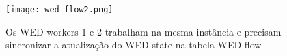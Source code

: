 \documentclass[conference]{IEEEtran}
\begin{document}
\begin{figure}[!t]
\centering
\texttt{[image: wed-flow2.png]}
\caption{Os WED-workers 1 e 2 trabalham na mesma instância e precisam sincronizar a atualização do WED-state na tabela
WED-flow}
\label{fig_wf}
\end{figure}


%
%



%
%
\end{document}
